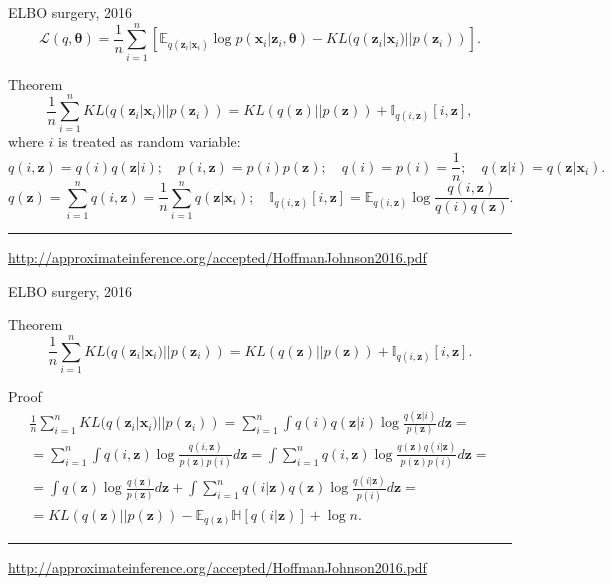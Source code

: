 \documentclass{beamer}
\newcommand{\bx}{\mathbf{x}}
\newcommand{\bz}{\mathbf{z}}
\newcommand{\btheta}{\boldsymbol{\theta}}
\begin{document}
\begin{frame}{ELBO surgery, 2016}
\vspace{-0.3cm}
\[
    \mathcal{L}(q, \btheta) = \frac{1}{n} \sum_{i=1}^n \left[ \mathbb{E}_{q(\bz_i | \bx_i)} \log p(\bx_i | \bz_i, \btheta) - KL(q(\bz_i | \bx_i) || p(\bz_i)) \right].
\]
\vspace{-0.3cm}
\begin{block}{Theorem}
\[
    \frac{1}{n} \sum_{i=1}^n KL(q(\bz_i | \bx_i) || p(\bz_i)) = KL(q(\bz) || p(\bz)) + \mathbb{I}_{q(i, \bz)} [i, \bz],
\]
where $i$ is treated as random variable:
\footnotesize{
\[
    q(i, \bz) = q(i) q(\bz | i); \quad p(i, \bz) = p(i) p(\bz); \quad 
    q(i) = p(i) = \frac{1}{n}; \quad q(\bz | i) = q(\bz | \bx_i).
\]
\[
    q(\bz) = \sum_{i=1}^n q(i, \bz) = \frac{1}{n} \sum_{i=1}^n q(\bz | \bx_i); \quad  \mathbb{I}_{q(i, \bz)} [i, \bz] = \mathbb{E}_{q(i, \bz)} \log \frac{q(i, \bz)}{q(i)q(\bz)}.
\]
}
\end{block}

\vfill
\hrule\medskip
{\scriptsize \href{http://approximateinference.org/accepted/HoffmanJohnson2016.pdf}{http://approximateinference.org/accepted/HoffmanJohnson2016.pdf}}
\end{frame}
\begin{frame}{ELBO surgery, 2016}
\begin{block}{Theorem}
\[
    \frac{1}{n} \sum_{i=1}^n KL(q(\bz_i | \bx_i) || p(\bz_i)) = KL(q(\bz) || p(\bz)) + \mathbb{I}_{q(i, \bz)} [i, \bz].
\]
\end{block}
\begin{block}{Proof}
\vspace{-0.3cm}
{\footnotesize
\begin{multline*}
    \frac{1}{n} \sum_{i=1}^n KL(q(\bz_i | \bx_i) || p(\bz_i)) = \sum_{i=1}^n \int q(i) q(\bz | i) \log \frac{q(\bz | i)}{p(\bz)} d \bz = \\
    = \sum_{i=1}^n \int q(i, \bz) \log \frac{q(i, \bz)}{p(\bz)p(i)} d \bz =
    \int \sum_{i=1}^n q(i, \bz) \log \frac{ q (\bz) q(i | \bz) }{p(\bz) p(i) } d \bz = \\
    = \int q(\bz) \log \frac{q(\bz)}{p(\bz)} d\bz + \int \sum_{i=1}^n q(i | \bz) q(\bz) \log \frac{q(i | \bz)}{p(i)} d \bz = \\
    = KL (q(\bz) || p(\bz)) - \mathbb{E}_{q(\bz)} \mathbb{H} \left[q(i | \bz)  \right] + \log n.
\end{multline*}
}
\end{block}
\vfill
\hrule\medskip
{\scriptsize \href{http://approximateinference.org/accepted/HoffmanJohnson2016.pdf}{http://approximateinference.org/accepted/HoffmanJohnson2016.pdf}}
\end{frame}
\end{document}
